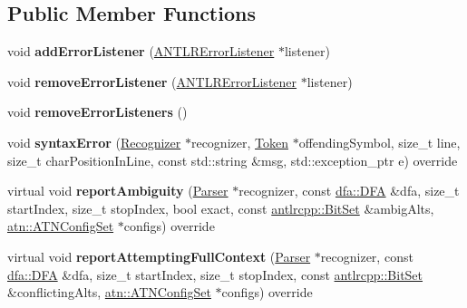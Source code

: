 \subsection*{Public Member Functions}
\begin{DoxyCompactItemize}
\item 
\mbox{\label{classantlr4_1_1ProxyErrorListener_a972056883899e3280b0aaf7d7fdaa963}} 
void {\bfseries add\+Error\+Listener} (\hyperlink{classantlr4_1_1ANTLRErrorListener}{A\+N\+T\+L\+R\+Error\+Listener} $\ast$listener)
\item 
\mbox{\label{classantlr4_1_1ProxyErrorListener_a5a830328aed09a28de5be14da8131a07}} 
void {\bfseries remove\+Error\+Listener} (\hyperlink{classantlr4_1_1ANTLRErrorListener}{A\+N\+T\+L\+R\+Error\+Listener} $\ast$listener)
\item 
\mbox{\label{classantlr4_1_1ProxyErrorListener_ad48444aa51a8b4e4f08fa847ba7f82f2}} 
void {\bfseries remove\+Error\+Listeners} ()
\item 
\mbox{\label{classantlr4_1_1ProxyErrorListener_a4c3323723f9ea559b0daa6202b426d4b}} 
void {\bfseries syntax\+Error} (\hyperlink{classantlr4_1_1Recognizer}{Recognizer} $\ast$recognizer, \hyperlink{classantlr4_1_1Token}{Token} $\ast$offending\+Symbol, size\+\_\+t line, size\+\_\+t char\+Position\+In\+Line, const std\+::string \&msg, std\+::exception\+\_\+ptr e) override
\item 
\mbox{\label{classantlr4_1_1ProxyErrorListener_aa7b84282b79cd8512a09116f86a780d2}} 
virtual void {\bfseries report\+Ambiguity} (\hyperlink{classantlr4_1_1Parser}{Parser} $\ast$recognizer, const \hyperlink{classantlr4_1_1dfa_1_1DFA}{dfa\+::\+D\+FA} \&dfa, size\+\_\+t start\+Index, size\+\_\+t stop\+Index, bool exact, const \hyperlink{classantlrcpp_1_1BitSet}{antlrcpp\+::\+Bit\+Set} \&ambig\+Alts, \hyperlink{classantlr4_1_1atn_1_1ATNConfigSet}{atn\+::\+A\+T\+N\+Config\+Set} $\ast$configs) override
\item 
\mbox{\label{classantlr4_1_1ProxyErrorListener_ada4685c32424c820dcfec5862d822869}} 
virtual void {\bfseries report\+Attempting\+Full\+Context} (\hyperlink{classantlr4_1_1Parser}{Parser} $\ast$recognizer, const \hyperlink{classantlr4_1_1dfa_1_1DFA}{dfa\+::\+D\+FA} \&dfa, size\+\_\+t start\+Index, size\+\_\+t stop\+Index, const \hyperlink{classantlrcpp_1_1BitSet}{antlrcpp\+::\+Bit\+Set} \&conflicting\+Alts, \hyperlink{classantlr4_1_1atn_1_1ATNConfigSet}{atn\+::\+A\+T\+N\+Config\+Set} $\ast$configs) override

\end{DoxyCompactItemize}
